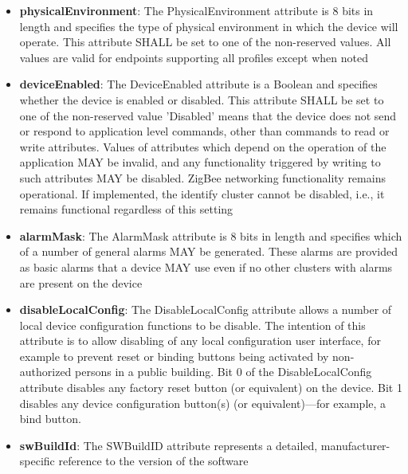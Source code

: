 \begin{itemize}
\item \textbf{physicalEnvironment}: The PhysicalEnvironment attribute is 8 bits in length and specifies the type of physical environment in which the device will operate. This attribute SHALL be set to one of the non-reserved values. All values are valid for endpoints supporting all profiles except when noted
\item \textbf{deviceEnabled}: The DeviceEnabled attribute is a Boolean and specifies whether the device is enabled or disabled. This attribute SHALL be set to one of the non-reserved value 'Disabled' means that the device does not send or respond to application level commands, other than commands to read or write attributes. Values of attributes which depend on the operation of the application MAY be invalid, and any functionality triggered by writing to such attributes MAY be disabled. ZigBee networking functionality remains operational. If implemented, the identify cluster cannot be disabled, i.e., it remains functional regardless of this setting
\item \textbf{alarmMask}: The AlarmMask attribute is 8 bits in length and specifies which of a number of general alarms MAY be generated. These alarms are provided as basic alarms that a device MAY use even if no other clusters with alarms are present on the device
\item \textbf{disableLocalConfig}: The DisableLocalConfig attribute allows a number of local device configuration functions to be disable. The intention of this attribute is to allow disabling of any local configuration user interface, for example to prevent reset or binding buttons being activated by non-authorized persons in a public building. Bit 0 of the DisableLocalConfig attribute disables any factory reset button (or equivalent) on the device. Bit 1 disables any device configuration button(s) (or equivalent)—for example, a bind button.
\item \textbf{swBuildId}: The SWBuildID attribute represents a detailed, manufacturer-specific reference to the version of the software
\end{itemize}

